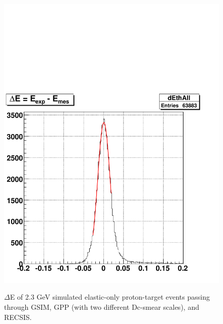 \begin{figure}[H]
{\includegraphics[scale=0.32]{figuresEG4/DcSmear/dE_ThAllEb3_DcSmear2p9}%
\label{fig:dcSm2.9}
}
\label{fig:dcSmEff} %
\caption[$\Delta$E of reconstructed simulated events]{$\Delta$E of 2.3 GeV simulated elastic-only proton-target events passing through GSIM, GPP (with two different Dc-smear scales), and RECSIS.}
\end{figure}




